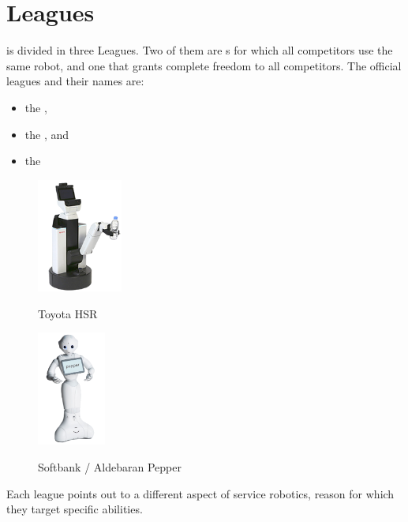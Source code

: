 \section{Leagues}
\label{sec:leagues}

 is divided in three Leagues. Two of them are s for which all competitors use the same robot, and one that grants complete freedom to all competitors. The official leagues and their names are:
\begin{itemize}
  \item the ,
  \item the , and
  \item the 
\end{itemize}

\begin{figure}
	\vspace{-30pt}
	\begin{center}
		\includegraphics[width=0.25\textwidth]{images/toyota_hsr.png}
		\label{fig:toyotaHSR}
		\vspace{-10pt}
		\caption{Toyota HSR}
	\end{center}

	\vspace{-25pt}
	\begin{center}
		\includegraphics[width=0.20\textwidth]{images/softbank_pepper.png}
		\label{fig:softbank-pepper}
		\vspace{-10pt}
		\caption{Softbank / Aldebaran Pepper}
	\end{center}
\end{figure}
Each league points out to a different aspect of service robotics, reason for which they target specific abilities.


